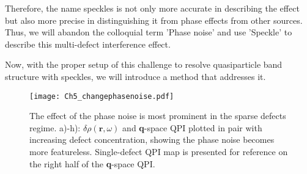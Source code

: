 Therefore, the name speckles is not only more accurate in describing the effect but also more precise in distinguishing it from phase effects from other sources. Thus, we will abandon the colloquial term 'Phase noise' and use 'Speckle' to describe this multi-defect interference effect. 

Now, with the proper setup of this challenge to resolve quasiparticle band structure with speckles, we will introduce a method that addresses it. 

\begin{figure}
	\texttt{[image: Ch5\_changephasenoise.pdf]} 
	\centering
	\caption{The effect of the phase noise is most prominent in the sparse defects regime. a)-h): $\delta\rho(\textbf{r},\omega)$ and \textbf{q}-space QPI plotted in pair with increasing defect concentration, showing the phase noise becomes more featureless. Single-defect QPI map is presented for reference on the right half of the \textbf{q}-space QPI.}
	\label{fig:ch5_changephasenoise}
\end{figure}
